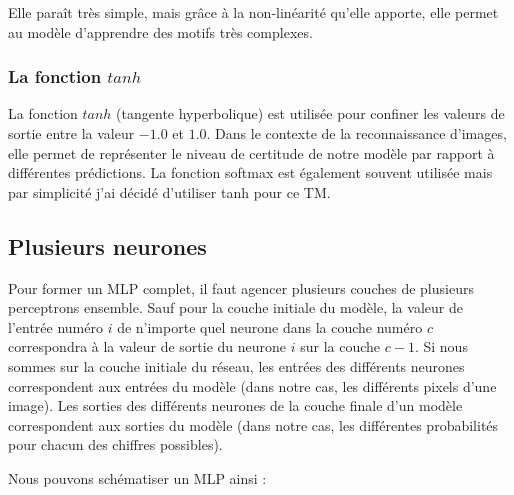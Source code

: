 \documentclass{article}
\begin{document}
Elle paraît très simple, mais grâce à la non-linéarité qu'elle apporte, elle permet au modèle d'apprendre des motifs très complexes.

\subsubsection{La fonction $tanh$}
La fonction $tanh$ (tangente hyperbolique) est utilisée pour confiner les valeurs de sortie entre la valeur $-1.0$ et $1.0$. Dans le contexte de la reconnaissance d'images, elle permet de représenter le niveau de certitude de notre modèle par rapport à différentes prédictions. La fonction softmax est également souvent utilisée mais par simplicité j'ai décidé d'utiliser tanh pour ce TM.


\subsection{Plusieurs neurones}
Pour former un MLP complet, il faut agencer plusieurs couches de plusieurs perceptrons ensemble. Sauf pour la couche initiale du modèle, la valeur de l'entrée numéro $i$ de n'importe quel neurone dans la couche numéro $c$ correspondra à la valeur de sortie du neurone $i$ sur la couche $c - 1$. Si nous sommes sur la couche initiale du réseau, les entrées des différents neurones correspondent aux entrées du modèle (dans notre cas, les différents pixels d'une image). Les sorties des différents neurones de la couche finale d'un modèle correspondent aux sorties du modèle (dans notre cas, les différentes probabilités pour chacun des chiffres possibles).

\medskip

Nous pouvons schématiser un MLP ainsi :
\end{document}

